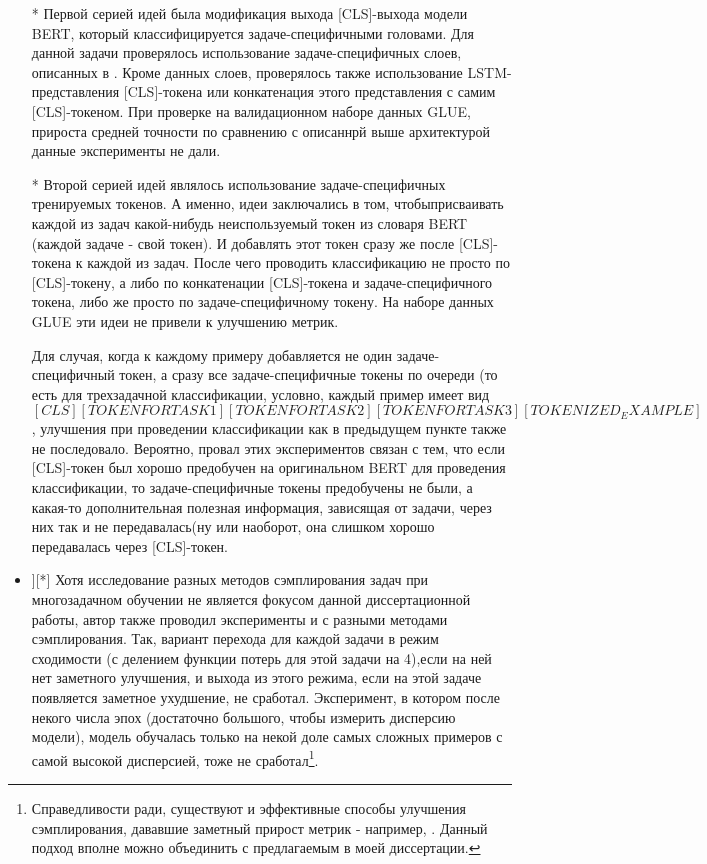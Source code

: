 \begin{itemize} 
 \item[*] Первой серией идей была модификация выхода [CLS]-выхода модели BERT, который классифицируется задаче-специфичными головами. Для данной задачи проверялось использование задаче-специфичных слоев, описанных в \cite{GhostBERT2021, TaskEmbedded2021, el-nouby2021xcit}. Кроме данных слоев, проверялось также использование LSTM-представления [CLS]-токена или конкатенация этого представления с самим [CLS]-токеном. При проверке на валидационном наборе данных GLUE, прироста средней точности по сравнению с описаннрй выше архитектурой данные эксперименты не дали. 
\item[*] Второй серией идей являлось использование задаче-специфичных тренируемых токенов. А именно, идеи заключались в том, чтобыприсваивать каждой из задач какой-нибудь неиспользуемый токен из словаря BERT (каждой задаче - свой токен). И добавлять этот токен сразу же после [CLS]-токена к каждой из задач. После чего проводить классификацию не просто по [CLS]-токену, а либо по конкатенации [CLS]-токена и задаче-специфичного токена, либо же просто по задаче-специфичному токену. На наборе данных GLUE эти идеи не привели к улучшению метрик.

 Для случая, когда к каждому примеру добавляется не один задаче-специфичный токен, а сразу все задаче-специфичные токены по очереди (то есть для трехзадачной классификации, условно, каждый пример имеет вид \textit{$[CLS] [TOKEN FOR TASK1] [TOKEN FOR TASK2] [TOKEN FOR TASK3] [TOKENIZED_EXAMPLE]$}, улучшения при проведении классификации как в предыдущем пункте также не последовало. 
Вероятно, провал этих экспериментов связан с тем, что если [CLS]-токен был хорошо предобучен на оригинальном BERT для проведения классификации, то задаче-специфичные токены предобучены не были, а какая-то дополнительная полезная информация, зависящая от задачи, через них так и не передавалась(ну или наоборот, она слишком хорошо передавалась через [CLS]-токен. 

\item][*] Хотя исследование разных методов сэмплирования задач при многозадачном обучении не является фокусом данной диссертационной работы, автор также проводил эксперименты и с разными методами сэмплирования. Так, вариант перехода для каждой задачи в режим сходимости (с делением функции потерь для этой задачи на 4),если на ней нет заметного улучшения, и выхода из этого режима, если на этой задаче появляется заметное ухудшение, не сработал. Эксперимент, в котором после некого числа эпох (достаточно большого, чтобы измерить дисперсию модели), модель обучалась только на некой доле самых сложных примеров с самой высокой дисперсией, тоже не сработал\footnote{Справедливости ради, существуют и эффективные способы улучшения сэмплирования, дававшие заметный прирост метрик - например, \cite{GradTS}. Данный подход вполне можно объединить с предлагаемым в моей диссертации.}. 
\end{itemize}

